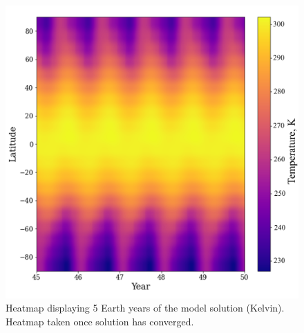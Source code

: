 \documentclass[12pt,onecolumn]{revtex4-2}    %
\begin{document}
\begin{figure}[t]
\centering
\includegraphics[width = 14cm]{Earth5yrsHeatmapNew.png}
\caption{Heatmap displaying 5 Earth years of the model solution (Kelvin). Heatmap taken once solution has converged.}
\label{fig:test}
\end{figure}
\end{document}
